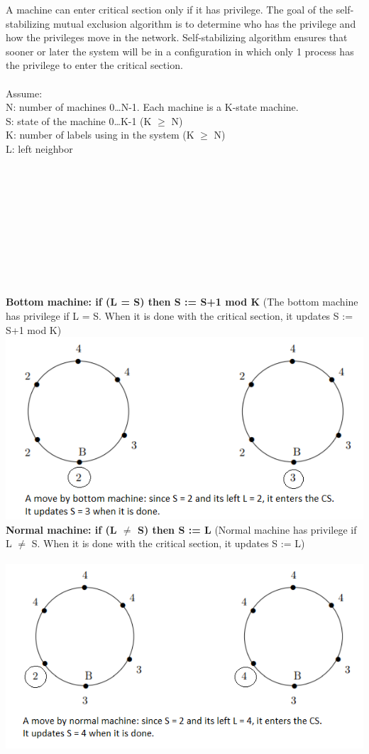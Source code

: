 \documentclass[twoside]{article}
\begin{document}
A machine can enter critical section only if it has privilege. The goal of the self-stabilizing mutual exclusion algorithm is to determine who has the privilege and how the privileges move in the network. Self-stabilizing algorithm ensures that sooner or later the system will be in a configuration in which only 1 process has the privilege to enter the critical section. \\
\\
Assume:\\
N: number of machines 0\ldots N-1. Each machine is a K-state machine. \\
S: state of the machine 0\ldots K-1 (K $\geq$ N) \\
K: number of labels using in the system (K $\geq$ N) \\
L: left neighbor \\\\\\\\\\\\\\\\\\\\\\
\textbf{Bottom machine: if (L = S) then S := S+1 mod K }
(The bottom machine has privilege if L = S. When it is done with the critical section, it updates S := S+1 mod K) \\
\includegraphics[scale=0.6]{bottom.PNG} \\

\textbf{Normal machine: if (L $\neq$ S) then S := L}
(Normal machine has privilege if L $\neq$ S. When it is done with the critical section, it updates S := L) \\\\
\includegraphics[scale=0.6]{normal.PNG} \\\\
\end{document}

